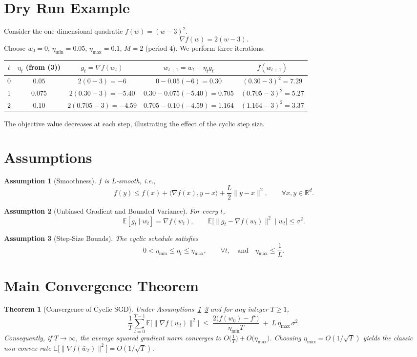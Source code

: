 \documentclass{article}
\newtheorem{theorem}{Theorem}
\newtheorem{assumption}{Assumption}
\begin{document}
\section*{Dry Run Example}
Consider the one‑dimensional quadratic $f(w)=(w-3)^2$.
\[
\nabla f(w)=2(w-3).
\]
Choose $w_0=0$, $\eta_{\min}=0.05$, $\eta_{\max}=0.1$, $M=2$ (period $4$).  
We perform three iterations.

\begin{center}
\begin{tabular}{c|c|c|c|c}
$t$ & $\eta_t$ (from (3)) & $g_t=\nabla f(w_t)$ & $w_{t+1}=w_t-\eta_t g_t$ & $f(w_{t+1})$ \\ \hline
0 & $0.05$ & $2(0-3)=-6$ & $0-0.05(-6)=0.30$ & $(0.30-3)^2=7.29$ \\
1 & $0.075$ & $2(0.30-3)=-5.40$ & $0.30-0.075(-5.40)=0.705$ & $(0.705-3)^2=5.27$ \\
2 & $0.10$ & $2(0.705-3)=-4.59$ & $0.705-0.10(-4.59)=1.164$ & $(1.164-3)^2=3.37$
\end{tabular}
\end{center}
The objective value decreases at each step, illustrating the effect of the cyclic step size.

\newpage

\section*{Assumptions}
\begin{assumption}[Smoothness]\label{ass:smooth}
$f$ is $L$‑smooth, i.e.,
\[
f(y)\le f(x)+\langle\nabla f(x),y-x\rangle+\frac{L}{2}\|y-x\|^2,
\qquad\forall x,y\in\mathbb{R}^d .
\tag{4}
\]
\end{assumption}

\begin{assumption}[Unbiased Gradient and Bounded Variance]\label{ass:sgd}
For every $t$,
\[
\mathbb{E}[g_t\mid w_t]=\nabla f(w_t),\qquad
\mathbb{E}\big[\|g_t-\nabla f(w_t)\|^2\mid w_t\big]\le\sigma^2 .
\tag{5}
\]
\end{assumption}

\begin{assumption}[Step‑Size Bounds]\label{ass:steps}
The cyclic schedule satisfies
\[
0<\eta_{\min}\le\eta_t\le\eta_{\max},\qquad\forall t,
\quad\text{and}\quad \eta_{\max}\le\frac{1}{L}.
\tag{6}
\]
\end{assumption}

\section*{Main Convergence Theorem}
\begin{theorem}[Convergence of Cyclic SGD]\label{thm:main}
Under Assumptions~\ref{ass:smooth}–\ref{ass:steps} and for any integer $T\ge1$,
\[
\frac{1}{T}\sum_{t=0}^{T-1}\mathbb{E}\big[\|\nabla f(w_t)\|^2\big]
\;\le\;
\frac{2\big(f(w_0)-f^\star\big)}{\eta_{\min}T}
\;+\;
L\,\eta_{\max}\,\sigma^2 .
\tag{7}
\]
Consequently, if $T\to\infty$, the average squared gradient norm converges to
$O\!\big(\frac{1}{T}\big)+O\!\big(\eta_{\max}\big)$. Choosing $\eta_{\max}=O(1/\sqrt{T})$ yields the classic non‑convex rate
$\mathbb{E}\big[\|\nabla f(\bar w_T)\|^2\big]=O(1/\sqrt{T})$.
\end{theorem}
\end{document}
